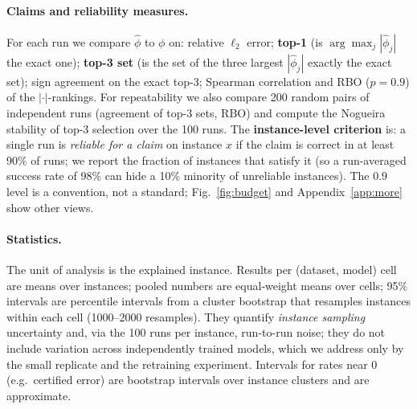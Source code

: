 \documentclass{article}
\newcommand{\phat}{\hat\phi}
\begin{document}
\begin{table}[t]
\centering\small\setlength{\tabcolsep}{4pt}

\caption{Datasets and models. $d$: players; $b_{\rm ref}$: size of the reference background sample used to tabulate $v$ (the main experiments use its first 100 rows); \#inst.: explained test instances per model.}\label{tab:setup}
\end{table}

\paragraph{Claims and reliability measures.} For each run we compare $\phat$ to $\phi$ on: relative $\ell_2$ error; \textbf{top-1} (is $\arg\max_j|\phat_j|$ the exact one); \textbf{top-3 set} (is the set of the three largest $|\phat_j|$ exactly the exact set); sign agreement on the exact top-3; Spearman correlation and RBO ($p{=}0.9$) of the $|\cdot|$-rankings. For repeatability we also compare 200 random pairs of independent runs (agreement of top-3 sets, RBO) and compute the Nogueira stability of top-3 selection over the 100 runs. The \textbf{instance-level criterion} is: a single run is \emph{reliable for a claim} on instance $x$ if the claim is correct in at least 90\% of runs; we report the fraction of instances that satisfy it (so a run-averaged success rate of 98\% can hide a 10\% minority of unreliable instances). The 0.9 level is a convention, not a standard; Fig.~\ref{fig:budget} and Appendix~\ref{app:more} show other views.

\paragraph{Statistics.} The unit of analysis is the explained instance. Results per (dataset, model) cell are means over instances; pooled numbers are equal-weight means over cells; 95\% intervals are percentile intervals from a cluster bootstrap that resamples instances within each cell (1000--2000 resamples). They quantify \emph{instance sampling} uncertainty and, via the 100 runs per instance, run-to-run noise; they do not include variation across independently trained models, which we address only by the small replicate and the retraining experiment. Intervals for rates near 0 (e.g.\ certified error) are bootstrap intervals over instance clusters and are approximate.
\end{document}
